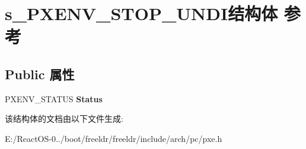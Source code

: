 \hypertarget{structs___p_x_e_n_v___s_t_o_p___u_n_d_i}{}\section{s\+\_\+\+P\+X\+E\+N\+V\+\_\+\+S\+T\+O\+P\+\_\+\+U\+N\+D\+I结构体 参考}
\label{structs___p_x_e_n_v___s_t_o_p___u_n_d_i}
\subsection*{Public 属性}
\begin{DoxyCompactItemize}
\item 
\mbox{\label{structs___p_x_e_n_v___s_t_o_p___u_n_d_i_abe5c90544acc4700f66828375c23e2cf}} 
P\+X\+E\+N\+V\+\_\+\+S\+T\+A\+T\+US {\bfseries Status}
\end{DoxyCompactItemize}


该结构体的文档由以下文件生成\+:\begin{DoxyCompactItemize}
\item 
E\+:/\+React\+O\+S-\/0../boot/freeldr/freeldr/include/arch/pc/pxe.\+h\end{DoxyCompactItemize}
